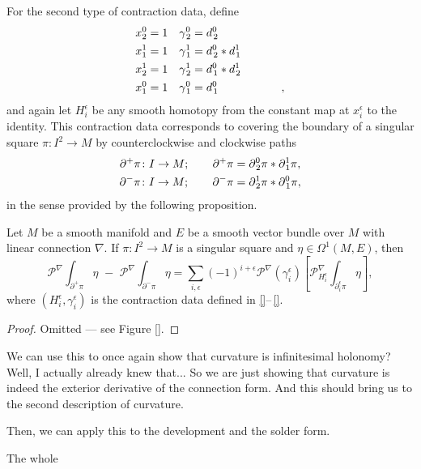 \noindent For the second type of contraction data, define 
\begin{align}
x_2^0 &= 1 & \gamma_{\mskip 2mu 2}^{0} &= d_{\mskip 2mu 2}^{0} \\
x_1^1 &= 1 & \gamma_{\mskip 2mu 1}^{1} &= d_{\mskip 2mu 2}^{0} \ast d_{\mskip 1.5mu 1}^{1} \\
x_2^1 &= 1 & \gamma_{\mskip 2mu 2}^{1} &= d_{\mskip 2mu 1}^{0} \ast d_{\mskip 1.5mu 2}^{1} \\
x_1^0 &= 1 & \gamma_{\mskip 2mu 1}^{0} &= d_{\mskip 2mu 1}^{0} \hphantom{\ast d_{\mskip 1.5mu 1}^{1} \ast \overline{d_{\mskip 2mu 2}^{1}} \ast \overline{d_{\mskip 2mu 1}^{0}}},
\end{align}
and again let $H_i^\epsilon$ be any smooth homotopy from the constant map at $x_i^\epsilon$ to the identity. This contraction data corresponds to covering the boundary of a singular square $\pi \colon I^2 \to M$ by counterclockwise and clockwise paths
\begin{align}
\partial^+ \pi \colon I \to M; \quad \quad \partial^+ \pi &= \partial_{\mskip 2mu 2}^{0} \pi \ast \partial_{\mskip 1.5mu  1}^{1} \pi, \\
\partial^- \pi \colon I \to M; \quad \quad \partial^- \pi &= \partial_{\mskip 1.75mu 2}^{1}\pi \ast \partial_{\mskip 2.5mu 1}^{0}\pi,
\end{align}
in the sense provided by the following proposition.
\begin{proposition}
  Let $M$ be a smooth manifold and $E$ be a smooth vector bundle over $M$ with linear connection $\nabla$. If $\pi \colon I^2 \to M$ is a singular square and $\eta \in \Omega^{1}(M, E)$, then
  \begin{equation}
    \mathcal{P}^\nabla \!\! \int_{\partial^+ \pi} \eta \,\, - \, \, \mathcal{P}^\nabla \!\! \int_{\partial^- \pi} \eta = \sum_{i, \epsilon} (-1)^{i+\epsilon} \mathcal{P}^\nabla(\gamma_i^\epsilon) \left[\mathcal{P}^\nabla_{H_i^\epsilon} \!\! \int_{\partial_i^\epsilon \pi} \eta \right],
  \end{equation}
  where $(H_i^\epsilon, \gamma_i^\epsilon)$ is the contraction data defined in \eqref{}--\,\eqref{}.
\end{proposition}
\begin{proof}
  Omitted --- see Figure \ref{}.
\end{proof}

We can use this to once again show that curvature is infinitesimal holonomy? Well, I actually already knew that... So we are just showing that curvature is indeed the exterior derivative of the connection form. And this should bring us to the second description of curvature.

Then, we can apply this to the development and the solder form. 

The whole 
